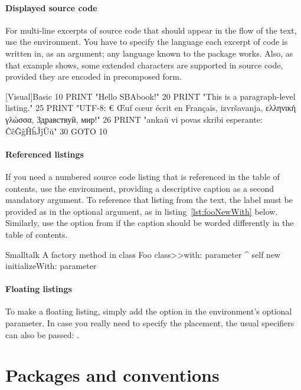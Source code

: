 \documentclass[twoside,openany,showtrims]{sbabook.bod}
\begin{document}
\paragraph{Displayed source code}
For multi-line excerpts of source code that should appear in the flow of the
text, use the  environment.
You have to specify the language each excerpt of code is written in, as an
argument; any language known to the  package works.
Also, as that example shows, some extended characters are supported in source code, provided they are encoded in precomposed form.

\begin{displaycode}{[Visual]Basic}
10 PRINT "Hello SBAbook!"
20 PRINT "This is a paragraph-level listing."
25 PRINT "UTF-8: € Œuf cœur écrit en Français, izvršavanja, ελληνική γλώσσα, Здравствуй, мир!"
26 PRINT "ankaŭ vi povas skribi esperante: ĈĉĜĝĤĥĴĵŬŭ"
30 GOTO 10
\end{displaycode}


\paragraph{Referenced listings}
If you need a numbered source code listing that is referenced in the table of
contents, use the  environment, providing a descriptive caption as
a second mandatory argument.
To reference that listing from the text, the label must be provided as
 in the optional argument, as in
listing~\ref{lst:fooNewWith} below.
Similarly, use the  option from  if the caption
should be worded differently in the table of contents.

\begin{listing}[label=lst:fooNewWith]{Smalltalk}
{A factory method in class }
Foo class>>with: parameter
  ^ self new
    initializeWith: parameter
\end{listing}


\paragraph{Floating listings}
To make a floating listing, simply add the  option in the
environment's optional parameter.
In case you really need to specify the placement, the usual specifiers can also
be passed: .


\section{Packages and conventions}



\clearpage
\end{document}
